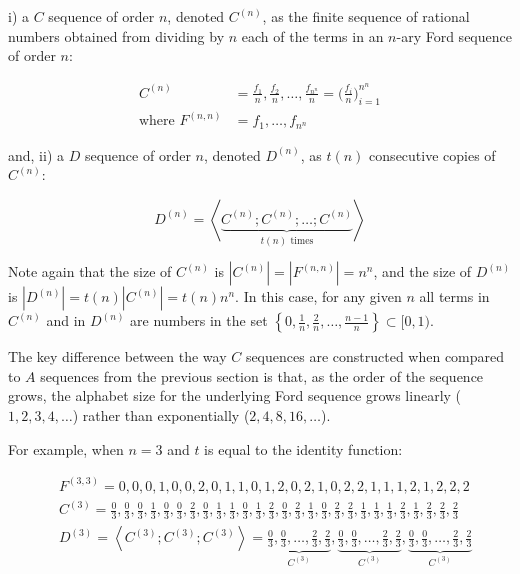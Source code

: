 \documentclass[11pt,a4paper]{tesis}
\theoremstyle{plain}
\theoremstyle{definition}
\begin{document}
i) a $C$ sequence of order $n$, denoted $C^{(n)}$, as the finite sequence of rational numbers obtained from dividing by $n$ each of the terms in an $n$-ary Ford sequence of order $n$:

\begin{equation*}
  \begin{aligned}
    C^{(n)} & = \frac{f_1}{n}, \frac{f_2}{n}, \dots, \frac{f_{n^n}}{n} = \bigg( \frac{f_i}{n} \bigg)_{i = 1}^{n^n} \\
    \text{where } F^{(n, n)} & = f_1, \dots, f_{n^n}
  \end{aligned}
\end{equation*}

and, ii) a $D$ sequence of order $n$, denoted $D^{(n)}$, as $t(n)$ consecutive copies of $C^{(n)}$:

\begin{equation*}
  D^{(n)} = \left< \underbrace{C^{(n)} ; C^{(n)} ; \dots ; C^{(n)}}_{t(n) \text{ times}} \right>
\end{equation*}

Note again that the size of $C^{(n)}$ is $|C^{(n)}| = |F^{(n, n)}| = n^n$, and the size of $D^{(n)}$ is $|D^{(n)}| = t(n) |C^{(n)}| = t(n) n^n$. In this case, for any given $n$ all terms in $C^{(n)}$ and in $D^{(n)}$ are numbers in the set $\left \{ 0, \frac{1}{n}, \frac{2}{n}, \dots, \frac{n - 1}{n} \right \} \subset [0, 1)$.

The key difference between the way $C$ sequences are constructed when compared to $A$ sequences from the previous section is that, as the order of the sequence grows, the alphabet size for the underlying Ford sequence grows linearly ($1, 2, 3, 4, \dots$) rather than exponentially ($2, 4, 8, 16, \dots$).

For example, when $n = 3$ and $t$ is equal to the identity function:

\begin{equation*}
  \begin{aligned}
    & F^{(3, 3)} = 0, 0, 0, 1, 0, 0, 2, 0, 1, 1, 0, 1, 2, 0, 2, 1, 0, 2, 2, 1, 1, 1, 2, 1, 2, 2, 2 \\
    & C^{(3)} = \frac{0}{3}, \frac{0}{3}, \frac{0}{3}, \frac{1}{3}, \frac{0}{3}, \frac{0}{3}, \frac{2}{3}, \frac{0}{3}, \frac{1}{3}, \frac{1}{3}, \frac{0}{3}, \frac{1}{3}, \frac{2}{3}, \frac{0}{3}, \frac{2}{3}, \frac{1}{3}, \frac{0}{3}, \frac{2}{3}, \frac{2}{3}, \frac{1}{3}, \frac{1}{3}, \frac{1}{3}, \frac{2}{3}, \frac{1}{3}, \frac{2}{3}, \frac{2}{3}, \frac{2}{3} \\
    & D^{(3)} = \left< C^{(3)} ; C^{(3)} ; C^{(3)} \right> = \underbrace{\frac{0}{3}, \frac{0}{3}, \dots, \frac{2}{3}, \frac{2}{3}}_{C^{(3)}}, \underbrace{\frac{0}{3}, \frac{0}{3}, \dots, \frac{2}{3}, \frac{2}{3}}_{C^{(3)}}, \underbrace{\frac{0}{3}, \frac{0}{3}, \dots, \frac{2}{3}, \frac{2}{3}}_{C^{(3)}}
  \end{aligned}
\end{equation*}
\end{document}
